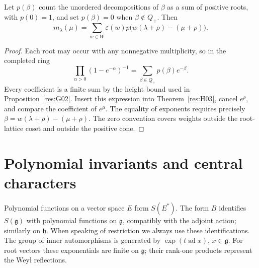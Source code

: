 \begin{theorem}
\label{res:H06}
Let \(p(\beta)\) count the unordered decompositions of \(\beta\)
as a sum of positive roots, with \(p(0)=1\), and set \(p(\beta)=0\)
when \(\beta\notin Q_+\). Then
\[
 m_\lambda(\mu)=
   \sum_{w\in W}\varepsilon(w)
      p\bigl(w(\lambda+\rho)-(\mu+\rho)\bigr).
\]
\end{theorem}
\begin{proof}
Each root may occur with any nonnegative multiplicity, so in the
completed ring
\[
 \prod_{\alpha>0}(1-e^{-\alpha})^{-1}
     =\sum_{\beta\in Q_+}p(\beta)e^{-\beta}.
\]
Every coefficient is a finite sum by the height bound used in
Proposition~\ref{res:G02}.
Insert this expression into Theorem~\ref{res:H03}, cancel
\(e^\rho\), and compare the coefficient of \(e^\mu\).
The equality of exponents requires precisely
\(\beta=w(\lambda+\rho)-(\mu+\rho)\).
The zero convention covers weights outside the root-lattice
coset and outside the positive cone.
\end{proof}

\section{Polynomial invariants and central characters}

Polynomial functions on a vector space \(E\) form \(S(E^*)\).
The form \(B\) identifies \(S(\mathfrak g)\) with polynomial
functions on \(\mathfrak g\), compatibly with the adjoint action;
similarly on \(\mathfrak h\). When speaking of restriction we
always use these identifications. The group of inner automorphisms
is generated by \(\exp(t\operatorname{ad}x)\), \(x\in\mathfrak g\).
For root vectors these exponentials are finite on \(\mathfrak g\);
their rank-one products represent the Weyl reflections.

